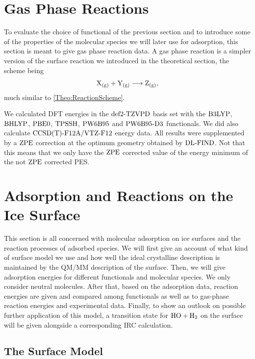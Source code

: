 \documentclass[8.5pt,twoside,twocolumn]{article}
\newcommand\zpe{\enmat{\te{ZPE}}}
\newcommand\gas{\enmat{_\te{(g)}}}
\newcommand\dlfind{\enmat{\te{DL-FIND}}}
\theoremstyle{standard}
\begin{document}

\section{Gas Phase Reactions}
\label{Sec:Gas}

To evaluate the choice of functional of the previous section
and to introduce some of the properties of the molecular species we
will later use for adsorption, this section is meant to
give gas phase reaction data. A gas phase reaction is a simpler
version of the surface reaction we introduced in the
theoretical section, the scheme being
\begin{equation}
\X\gas + \Y\gas \chemar \te Z\gas,
\label{Gas:Scheme}
\end{equation}
much similar to \eqref{Theo:ReactionScheme}.

We calculated DFT energies in the $\text{def2-TZVPD}$ basis set with
the $\text{B3LYP}$, $\text{BHLYP}$, $\text{PBE0}$, $\text{TPSSH}$, $\text{PW6B95}$ and $\text{PW6B95}\text{-D3}$
functionals. We did also calculate $\text{CCSD(T)-F12A}/\text{VTZ-F}12$ energy data.
All results were supplemented by a $\zpe$ correction at the
optimum geometry obtained by $\dlfind$. Not that this means
that we only have the $\zpe$ corrected value of the energy
minimum of the not $\zpe$ corrected PES.


\section{Adsorption and Reactions on the Ice Surface}
\label{Sec:Ads}
\newcommand\hoht{\enmat{\te{HO}+\te H_2}}

This section is all concerned with molecular adsorption on ice surfaces
and the reaction processes of adsorbed species. We will first give an
account of what kind of surface model we use and how well the ideal
crystalline description is maintained by the QM/MM description of
the surface. Then, we will give adsorption energies for different
functionals and molecular species. We only consider neutral molecules.
After that, based on the adsorption data, reaction energies are given
and compared among functionals as well as to gas-phase reaction
energies and experimental data. Finally, to show an outlook on
possible further application of this model, a transition state for
$\hoht$ on the surface will be given alongside a corresponding IRC
calculation.

\subsection{The Surface Model}
\label{Sec:Ads:Model}
\end{document}
